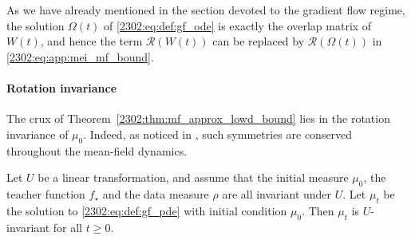 As we have already mentioned in the section devoted to the gradient flow regime, the solution $\Omega(t)$ of \eqref{2302:eq:def:gf_ode} is exactly the overlap matrix of $W(t)$, and hence the term $\mathcal{R}(W(t))$ can be replaced by $\mathcal{R}(\Omega(t))$ in \eqref{2302:eq:app:mei_mf_bound}.

\paragraph{Rotation invariance} The crux of Theorem~\ref{2302:thm:mf_approx_lowd_bound} lies in the rotation invariance of $\mu_0$. Indeed, as noticed in \cite{abbe2022merged,hajjar2023symmetries}, such symmetries are conserved throughout the mean-field dynamics.
\begin{proposition}\label{2302:prop:app:chizat_symmetry}
Let $U$ be a linear transformation, and assume that the initial measure $\mu_0$, the teacher function $f_\star$ and the data measure $\rho$ are all invariant under $U$. Let $\mu_t$ be the solution to \eqref{2302:eq:def:gf_pde} with initial condition $\mu_0$. Then $\mu_t$ is $U$-invariant for all $t \geq 0$.
\end{proposition}

